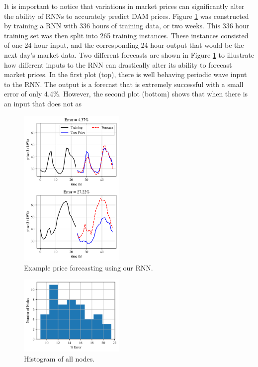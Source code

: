 \documentclass[sigconf]{acmart}
\begin{document}
It is important to notice that variations in market prices can significantly alter the ability of RNNs to accurately predict DAM prices. Figure \ref{fig:ex_forecast} was constructed by training a RNN with 336 hours of training data, or two weeks. This 336 hour training set was then split into 265 training instances. These instances consisted of one 24 hour input, and the corresponding 24 hour output that would be the next day's market data. Two different forecasts are shown in Figure \ref{fig:ex_forecast} to illustrate how different inputs to the RNN can drastically alter its ability to forecast market prices. In the first plot (top), there is well behaving periodic wave input to the RNN. The output is a forecast that is extremely successful with a small error of only 4.4\%. However, the second plot (bottom) shows that when there is an input that does not as 

\begin{figure}[h]
\includegraphics[width=0.45\textwidth]{fig_3.png}
\caption{Example price forecasting using our RNN.}
\label{fig:ex_forecast}
\end{figure}

\begin{figure}[h]
\includegraphics[width=0.45\textwidth]{fig_5.png}
\caption{Histogram of all nodes.}
\label{fig:hist_small}
\end{figure}
\end{document}
